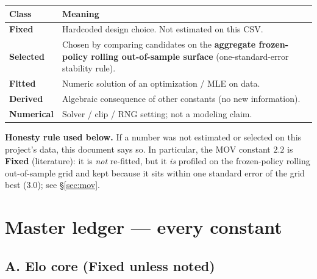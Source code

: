 \documentclass[10pt]{article}
\newcommand{\cls}[1]{\textbf{#1}}
\begin{document}
\begin{center}
\begin{tabular}{@{}lp{4.6in}@{}}
\toprule
\textbf{Class} & \textbf{Meaning} \\
\midrule
\cls{Fixed} & Hardcoded design choice. Not estimated on this CSV. \\
\cls{Selected} & Chosen by comparing candidates on the \textbf{aggregate frozen-policy rolling out-of-sample surface} (one-standard-error stability rule). \\
\cls{Fitted} & Numeric solution of an optimization / MLE on data. \\
\cls{Derived} & Algebraic consequence of other constants (no new information). \\
\cls{Numerical} & Solver / clip / RNG setting; not a modeling claim. \\
\bottomrule
\end{tabular}
\end{center}

\textbf{Honesty rule used below.}
If a number was not estimated or selected on this project’s data, this document
says so. In particular, the MOV constant \(2.2\) is \cls{Fixed} (literature): it
is \emph{not} re-fitted, but it \emph{is} profiled on the frozen-policy rolling
out-of-sample grid and kept because it sits within one standard error of the
grid best (\(3.0\)); see \S\ref{sec:mov}.

\section{Master ledger --- every constant}

\subsection{A. Elo core (\cls{Fixed} unless noted)}
\end{document}
